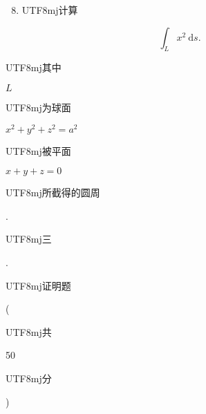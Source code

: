 \documentclass[10pt]{article}
\begin{document}
\begin{enumerate}
  \setcounter{enumi}{7}
  \item \begin{CJK}{UTF8}{mj}计算\end{CJK}
\end{enumerate}
$$
\int_{L} x^{2} \mathrm{~d} s .
$$
\begin{CJK}{UTF8}{mj}其中\end{CJK} $L$ \begin{CJK}{UTF8}{mj}为球面\end{CJK} $x^{2}+y^{2}+z^{2}=a^{2}$ \begin{CJK}{UTF8}{mj}被平面\end{CJK} $x+y+z=0$ \begin{CJK}{UTF8}{mj}所截得的圆周\end{CJK}.

\begin{CJK}{UTF8}{mj}三\end{CJK}. \begin{CJK}{UTF8}{mj}证明题\end{CJK} (\begin{CJK}{UTF8}{mj}共\end{CJK} 50 \begin{CJK}{UTF8}{mj}分\end{CJK})
\end{document}
